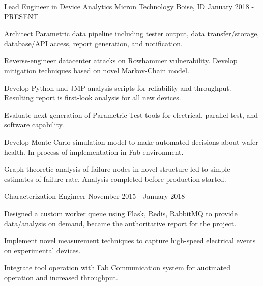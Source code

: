 

\begin{cventries}

  \cventry
    {Lead Engineer in Device Analytics} %
    {\href{https://www.micron.com}{Micron Technology}} %
    {Boise, ID} %
    {January 2018 - PRESENT} %
    {
      \begin{cvitems} %
        \item {Architect Parametric data pipeline including tester output, data transfer/storage, database/API access, report generation, and notification.}
        \item {Reverse-engineer datacenter attacks on Rowhammer vulnerability. Develop mitigation techniques based on novel Markov-Chain model.}
        \item {Develop Python and JMP analysis scripts for reliability and throughput. Resulting report is first-look analysis for all new devices.}
        \item {Evaluate next generation of Parametric Test tools for electrical, parallel test, and software capability.}
        \item {Develop Monte-Carlo simulation model to make automated decisions about wafer health. In process of implementation in Fab environment.}
        \item {Graph-theoretic analysis of failure nodes in novel structure led to simple estimates of failure rate. Analysis completed before production started.}
      \end{cvitems}
    }

  \cventry
    {Characterization Engineer} %
    {} %
    {} %
    {November 2015 - January 2018} %
    {
      \begin{cvitems} %
        \item {Designed a custom worker queue using Flask, Redis, RabbitMQ to provide data/analysis on demand, became the authoritative report for the project.}
        \item {Implement novel measurement techniques to capture high-speed electrical events on experimental devices.}
        \item {Integrate tool operation with Fab Communication system for auotmated operation and increased throughput.}
      \end{cvitems}
    }


\end{cventries}
